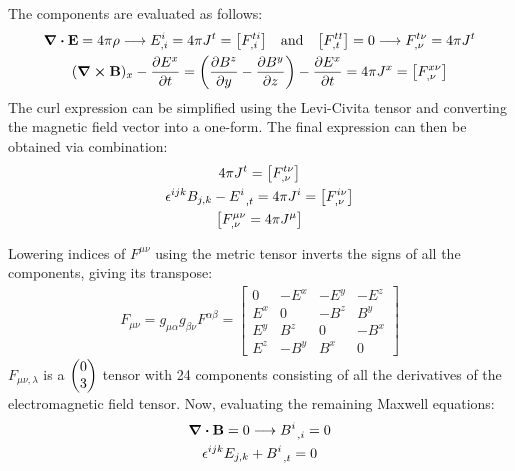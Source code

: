 \documentclass{report}
\begin{document}
\begin{subquests}
\begin{subquests}
		\item		
		The components are evaluated as follows:
		\begin{gather*}
			\div{{\vb E}} = 4\pi\rho \longrightarrow E^i_{,i} = 4\pi J^t = \bqty{F^{ti}_{,i}} \qq{and} \bqty{F^{tt}_{,t}} = 0 \longrightarrow F^{t\nu}_{,\nu} = 4\pi J^t \\
			(\curl{{\vb B}})_x - \pdv{E^x}{t} = \pqty{\pdv{B^z}{y} - \pdv{B^y}{z}} - \pdv{E^x}{t} = 4\pi J^x = \bqty{F^{x\nu}_{,\nu}}
		\end{gather*}
		The curl expression can be simplified using the Levi-Civita tensor and converting the magnetic field vector into a one-form. The final expression can then be obtained via combination:
		\begin{gather*}
			4\pi J^t = \bqty{F^{t\nu}_{,\nu}} \\
			\epsilon^{ijk}B_{j,k} - E^i_{\;\;,t} = 4\pi J^i = \bqty{F^{i\nu}_{,\nu}} \\
			\bqty{F^{\mu\nu}_{,\nu} = 4\pi J^{\mu}}
		\end{gather*}
		
		\item		
		Lowering indices of $F^{\mu\nu}$ using the metric tensor inverts the signs of all the components, giving its transpose:
		\begin{gather*}
			F_{\mu\nu} = g_{\mu\alpha}g_{\beta\nu} F^{\alpha\beta} =
			\begin{bmatrix}
				0 & -E^x & -E^y & -E^z \\
				E^x & 0 & -B^z & B^y \\
				E^y & B^z & 0 & -B^x \\
				E^z & -B^y & B^x & 0
			\end{bmatrix}
		\end{gather*}
		$F_{\mu\nu,\lambda}$ is a $\pmqty{0 \\ 3}$ tensor with 24 components consisting of all the derivatives of the electromagnetic field tensor. Now, evaluating the remaining Maxwell equations:
		\begin{gather*}
			\div{{\vb B}} = 0 \longrightarrow B^i_{\;\;,i} = 0 \\
			\epsilon^{ijk} E_{j,k} + B^i_{\;\;,t} = 0
		\end{gather*}

		\item

		\item

		\item

		\item
	\end{subquests}
\end{subquests}
\end{document}

